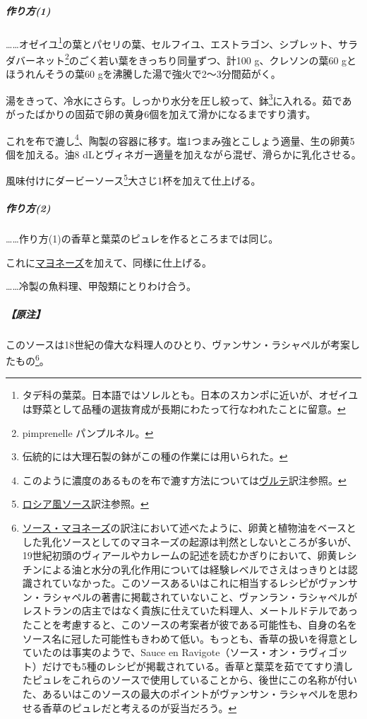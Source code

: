 \begin{recette}


\hypertarget{sauce-vincent-1}{%
\subparagraph{作り方(1)}\label{sauce-vincent-1}}

\ldots{}\ldots{}オゼイユ\footnote{タデ科の葉菜。日本語ではソレルとも。日本のスカンポに近いが、オゼイユは野菜として品種の選抜育成が長期にわたって行なわれたことに留意。}の葉とパセリの葉、セルフイユ、エストラゴン、シブレット、サラダバーネット\footnote{pimprenelle
  パンプルネル。}のごく若い葉をきっちり同量ずつ、計100 g、クレソンの葉60
gとほうれんそうの葉60 gを沸騰した湯で強火で2〜3分間茹がく。

湯をきって、冷水にさらす。しっかり水分を圧し絞って、鉢\footnote{伝統的には大理石製の鉢がこの種の作業には用いられた。}に入れる。茹であがったばかりの固茹で卵の黄身6個を加えて滑かになるまですり潰す。

これを布で漉し\footnote{このように濃度のあるものを布で漉す方法については\protect\hyperlink{veloute}{ヴルテ}訳注参照。}、陶製の容器に移す。塩1つまみ強とこしょう適量、生の卵黄5個を加える。油8
dLとヴィネガー適量を加えながら混ぜ、滑らかに乳化させる。

風味付けにダービーソース\footnote{\protect\hyperlink{sauce-russe-froide}{ロシア風ソース}訳注参照。}大さじ1杯を加えて仕上げる。

\hypertarget{sauce-vincent-2}{%
\subparagraph{作り方(2)}\label{sauce-vincent-2}}

\ldots{}\ldots{}作り方(1)の香草と葉菜のピュレを作るところまでは同じ。

これに\protect\hyperlink{mayonnaise}{マヨネーズ}を加えて、同様に仕上げる。

\ldots{}\ldots{}冷製の魚料理、甲殻類にとりわけ合う。

\hypertarget{nota-sauce-vincent}{%
\subparagraph{【原注】}\label{nota-sauce-vincent}}

このソースは18世紀の偉大な料理人のひとり、ヴァンサン・ラシャペルが考案したもの\footnote{\protect\hyperlink{mayonnaise}{ソース・マヨネーズ}の訳注において述べたように、卵黄と植物油をベースとした乳化ソースとしてのマヨネーズの起源は判然としないところが多いが、19世紀初頭のヴィアールやカレームの記述を読むかぎりにおいて、卵黄レシチンによる油と水分の乳化作用については経験レベルでさえはっきりとは認識されていなかった。このソースあるいはこれに相当するレシピがヴァンサン・ラシャペルの著書に掲載されていないこと、ヴァンラン・ラシャペルがレストランの店主ではなく貴族に仕えていた料理人、メートルドテルであったことを考慮すると、このソースの考案者が彼である可能性も、自身の名をソース名に冠した可能性もきわめて低い。もっとも、香草の扱いを得意としていたのは事実のようで、Sauce
  en
  Ravigote（ソース・オン・ラヴィゴット）だけでも5種のレシピが掲載されている。香草と葉菜を茹でてすり潰したピュレをこれらのソースで使用していることから、後世にこの名称が付いた、あるいはこのソースの最大のポイントがヴァンサン・ラシャペルを思わせる香草のピュレだと考えるのが妥当だろう。}。


\end{recette}
